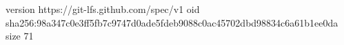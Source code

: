 version https://git-lfs.github.com/spec/v1
oid sha256:98a347c0e3ff5fb7c9747d0ade5fdeb9088c0ac45702dbd98834c6a61b1ee0da
size 71
